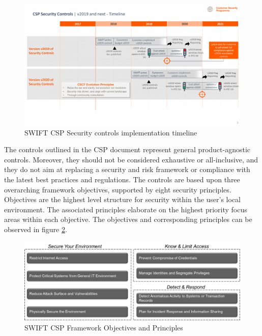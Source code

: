 \documentclass[12pt]{article}
\begin{document}
        \begin{figure}[H]
        \centering
        \includegraphics[width=\textwidth,cfbox=red 0.1mm 0.1mm]{figures/swift_csp.png}
        \caption{SWIFT CSP Security controls implementation timeline}
        \label{fig:swiftcsp}
        \end{figure}
        
        The controls outlined in the CSP document represent general product-agnostic controls. Moreover, they should not be considered exhaustive or all-inclusive, and they do not aim at replacing a security and risk framework or compliance with the latest best practices and regulations. The controls are based upon three overarching framework objectives, supported by eight security principles. Objectives are the highest level structure for security within the user's local environment. The associated principles elaborate on the highest priority focus areas within each objective. The objectives and corresponding principles can be observed in figure \ref{fig:swiftcspsection}.
        
        \begin{figure}[H]
        \centering
        \includegraphics[width=\textwidth,cfbox=red 0.1mm 0.1mm]{figures/SWIFT_CUSTOMER_FRAMEWORK.jpg}
        \caption{SWIFT CSP Framework Objectives and Principles}
        \label{fig:swiftcspsection}
        \end{figure}
       
\end{document}
